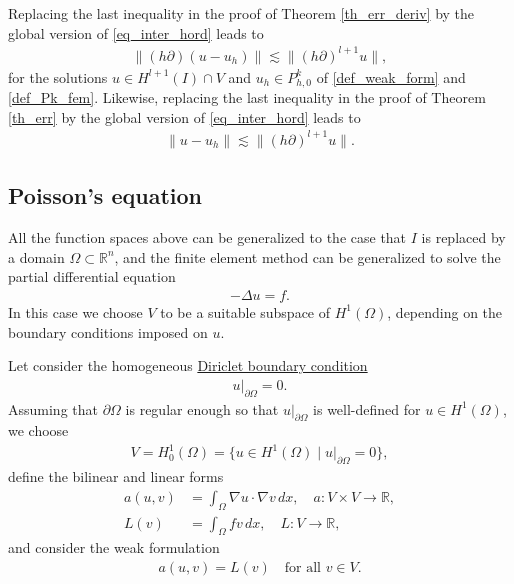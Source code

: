 \documentclass[12pt,oneside]{amsart}
\def\p{\partial}
\def\R{\mathbb R}
\begin{document}
Replacing the last inequality in the proof of Theorem \ref{th_err_deriv} by the global version of \eqref{eq_inter_hord}
leads to
    \begin{align*}
\|(h\partial)(u-u_h)\|
\lesssim
\|(h \partial)^{l+1} u\|,
    \end{align*}
for the solutions 
$u \in H^{l+1}(I) \cap V$ and $u_h \in P_{h,0}^k$ of \eqref{def_weak_form}
and \eqref{def_Pk_fem}. Likewise, replacing the last inequality in the proof of Theorem \ref{th_err} by the global version of \eqref{eq_inter_hord}
leads to
    \begin{align*}
\|u-u_h\|
\lesssim
\|(h \partial)^{l+1} u\|.
    \end{align*}

\subsection{Poisson's equation}

All the function spaces above can be generalized to the case that $I$ is replaced by a domain $\Omega \subset \R^n$,
and the finite element method can be generalized to solve the partial differential equation 
    \begin{align}\label{eq_poisson_nd}
- \Delta u = f.
    \end{align} 
In this case we choose $V$ to be a suitable subspace of $H^1(\Omega)$, depending on the boundary conditions imposed on $u$. 

Let consider the homogeneous \href{https://en.wikipedia.org/wiki/Dirichlet_boundary_condition}{Diriclet boundary condition}
    \begin{align}\label{eq_dirichlet}
u|_{\p \Omega} = 0.
    \end{align}
Assuming that $\p \Omega$ is regular enough so that $u|_{\p \Omega}$ is well-defined for $u \in H^1(\Omega)$, we choose
    \begin{align*}
V = H_0^1(\Omega) = \{u \in H^1(\Omega) \mid u|_{\p \Omega} = 0\},
    \end{align*} 
define the bilinear and linear forms 
    \begin{align*}
a(u,v) &= \int_\Omega \nabla u \cdot \nabla v\, dx,
\quad a : V \times V \to \R,
\\
L(v) &= \int_\Omega f v\, dx, \quad L : V \to \R,
    \end{align*}
and consider the weak formulation 
    \begin{align}\label{def_weak_nd}
a(u, v) = L(v) \quad \text{for all $v \in V$}.
    \end{align}
\end{document}
